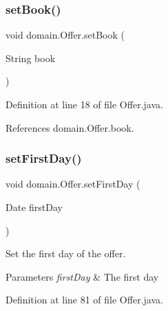 \subsubsection{\texorpdfstring{setBook()}{setBook()}}
{\footnotesize\ttfamily void domain.\+Offer.\+set\+Book (\begin{DoxyParamCaption}\item[{String}]{book }\end{DoxyParamCaption})}



Definition at line 18 of file Offer.\+java.


\begin{DoxyCode}{0}

\end{DoxyCode}


References domain.\+Offer.\+book.

\mbox{\label{classdomain_1_1Offer_aca5c8e3d34e700c8e51d1c9a0685e68f}} 
\subsubsection{\texorpdfstring{setFirstDay()}{setFirstDay()}}
{\footnotesize\ttfamily void domain.\+Offer.\+set\+First\+Day (\begin{DoxyParamCaption}\item[{Date}]{first\+Day }\end{DoxyParamCaption})}



Set the first day of the offer. 


\begin{DoxyParams}{Parameters}
{\em first\+Day} & The first day \\
\hline
\end{DoxyParams}


Definition at line 81 of file Offer.\+java.


\begin{DoxyCode}{0}

\end{DoxyCode}


